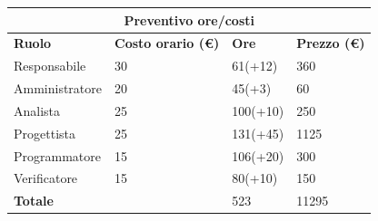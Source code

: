 \documentclass[a4paper, 12pt]{article}
\begin{document}
\begin{center}
	\begin{tabularx}{\textwidth}{|X|X|X|X|}
		\hline
		\multicolumn{4}{|c|}{\textbf{Preventivo ore/costi}}                                      \\
		\hline
		\hline
		\textbf{Ruolo}  & \textbf{Costo orario (\euro)} & \textbf{Ore} & \textbf{Prezzo (\euro)} \\
		\hline
		Responsabile    & 30                            & 61(+12)      & 360                     \\
		\hline
		Amministratore  & 20                            & 45(+3)       & 60                      \\
		\hline
		Analista        & 25                            & 100(+10)     & 250                     \\
		\hline
		Progettista     & 25                            & 131(+45)     & 1125                    \\
		\hline
		Programmatore   & 15                            & 106(+20)     & 300                     \\
		\hline
		Verificatore    & 15                            & 80(+10)      & 150                     \\
		\hline
		\hline
		\textbf{Totale} &                               & 523          & 11295                   \\
		\hline
	\end{tabularx}\\[8pt]
	\mbox{}\\
\end{center}
\end{document}
